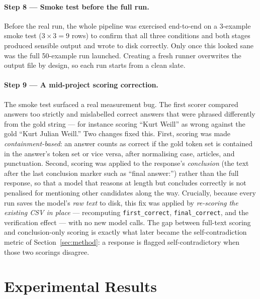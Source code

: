 \documentclass[11pt,a4paper]{article}
\begin{document}
\paragraph{Step 8 --- Smoke test before the full run.}
Before the real run, the whole pipeline was exercised end-to-end on a
3-example smoke test ($3\times3=9$ rows) to confirm that all three
conditions and both stages produced sensible output and wrote to disk
correctly. Only once this looked sane was the full 50-example run
launched. Creating a fresh runner overwrites the output file by design,
so each run starts from a clean slate.

\paragraph{Step 9 --- A mid-project scoring correction.}
The smoke test surfaced a real measurement bug. The first scorer
compared answers too strictly and mislabelled correct answers that were
phrased differently from the gold string --- for instance scoring
``Kurt Weill'' as wrong against the gold ``Kurt Julian Weill.'' Two
changes fixed this. First, scoring was made \emph{containment-based}:
an answer counts as correct if the gold token set is contained in the
answer's token set or vice versa, after normalising case, articles, and
punctuation. Second, scoring was applied to the response's
\emph{conclusion} (the text after the last conclusion marker such as
``final answer:'') rather than the full response, so that a model that
reasons at length but concludes correctly is not penalised for
mentioning other candidates along the way. Crucially, because every
run saves the model's \emph{raw text} to disk, this fix was applied by
\emph{re-scoring the existing CSV in place} --- recomputing
\texttt{first\_correct}, \texttt{final\_correct}, and the verification
effect --- with no new model calls. The gap between full-text scoring
and conclusion-only scoring is exactly what later became the
self-contradiction metric of Section~\ref{sec:method}: a response is
flagged self-contradictory when those two scorings disagree.

\section{Experimental Results}
\label{sec:results}
\end{document}
